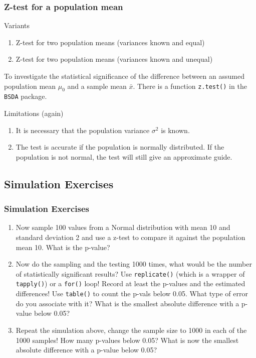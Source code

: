 \documentclass[xcolor={table}]{beamer}
\begin{document}
\begin{frame}\frametitle{Z-test for a population mean} 
  \begin{block}{Variants}
    \begin{enumerate}
      \item Z-test for two population means (variances known and equal)
      \item Z-test for two population means (variances known and unequal)
    \end{enumerate}
    To investigate the statistical significance of the difference between an assumed population mean $\mu_0$ and a sample mean $\bar{x}$. There is a function \texttt{z.test()} in the \texttt{BSDA} package.
  \end{block}
  \begin{alertblock}{Limitations (again)}
    \begin{enumerate}
      \item It is necessary that the population variance $\sigma^2$ is known. 
      \item The test is accurate if the population is normally distributed. If the population is not normal, the test will still give an approximate guide.
    \end{enumerate}
  \end{alertblock}
\end{frame}

\subsection{Simulation Exercises}
\begin{frame}\frametitle{Simulation Exercises} 
  \begin{enumerate}
  \item Now sample 100 values from a Normal distribution with mean 10 and standard deviation 2 and use a z-test to compare it against the population mean 10. What is the p-value?
  \item Now do the sampling and the testing 1000 times, what would be the number of statistically significant results? Use \texttt{replicate()} (which is a wrapper of \texttt{tapply()}) or a \texttt{for()} loop! Record at least the p-values and the estimated differences! Use \texttt{table()} to count the p-vals below 0.05. What type of error do you associate with it? What is the smallest absolute difference with a p-value below 0.05?
  \item Repeat the simulation above, change the sample size to 1000 in each of the 1000 samples! How many p-values below 0.05? What is now the smallest absolute difference with a p-value below 0.05?
  \end{enumerate}
\end{frame}
\end{document}
